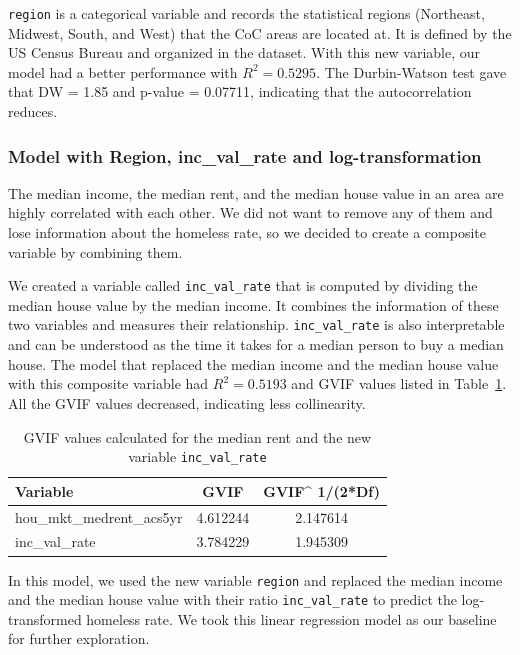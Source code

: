 \documentclass[12pt]{article}
\begin{document}
\texttt{region} is a categorical variable and records the statistical regions (Northeast, Midwest, South, and West) that the CoC areas are located at. It is defined by the US Census Bureau and organized in the dataset\cite{halpert_2023_cphalpertcensusregions}. With this new variable, our model had a better performance with $R^2 = 0.5295$. The Durbin-Watson test gave that DW = 1.85 and p-value = 0.07711, indicating that the autocorrelation reduces.

\subsubsection{Model with Region, inc\_val\_rate and log-transformation}\label{sec:final_model}

The median income, the median rent, and the median house value in an area are highly correlated with each other. We did not want to remove any of them and lose information about the homeless rate, so we decided to create a composite variable by combining them.

We created a variable called \texttt{inc\_val\_rate} that is computed by dividing the median house value by the median income. It combines the information of these two variables and measures their relationship. \texttt{inc\_val\_rate} is also interpretable and can be understood as the time it takes for a median person to buy a median house. The model that replaced the median income and the median house value with this composite variable had $R^2 = 0.5193$ and GVIF values listed in Table~\ref{tab:gvif_final}. All the GVIF values decreased, indicating less collinearity.

\begin{table}[ht]
\centering
\begin{tabular}{lcc}
\hline
\textbf{Variable} & \textbf{GVIF} & \textbf{GVIF\^{} 1/(2*Df)} \\
\hline
hou\_mkt\_medrent\_acs5yr & 4.612244 & 2.147614 \\
inc\_val\_rate & 3.784229 & 1.945309 \\
\hline
\end{tabular}
\caption{GVIF values calculated for the median rent and the new variable \texttt{inc\_val\_rate}}
\label{tab:gvif_final}
\end{table}

In this model, we used the new variable \texttt{region} and replaced the median income and the median house value with their ratio \texttt{inc\_val\_rate} to predict the log-transformed homeless rate. We took this linear regression model as our baseline for further exploration.
\end{document}

